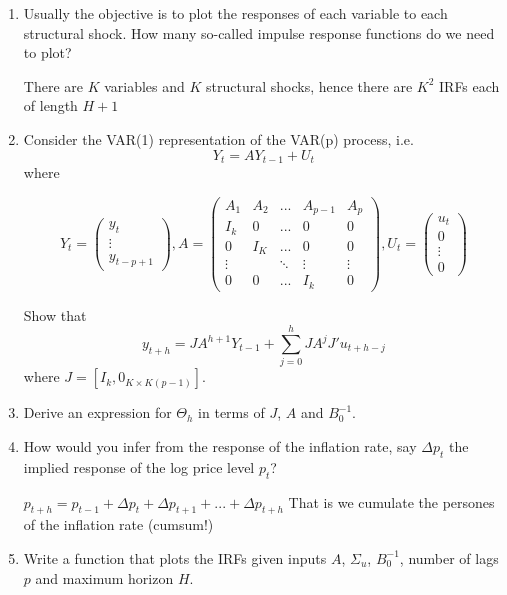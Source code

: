 \documentclass[a4paper]{scrartcl}
\begin{document}
\begin{enumerate}
	\item Usually the objective is to plot the responses of each variable to each structural shock. How many so-called impulse response functions do we need to plot?
	\begin{solution}
		There are $K$ variables and $K$ structural shocks, hence there are $K^2$ IRFs each of length $H+1$
	\end{solution}
	\item Consider the VAR(1) representation of the VAR(p) process, i.e. $$Y_t = A Y_{t-1} + U_t$$ where \begin{footnotesize}
		$$Y_t = \begin{pmatrix}
	y_t\\ \vdots\\ y_{t-p+1}
	\end{pmatrix}, 
	A = \begin{pmatrix}
	A_1 & A_2 & ... & A_{p-1} & A_p\\
	I_k &   0 & ... & 0       & 0\\
	0   &  I_K& ... & 0       & 0\\
	\vdots &  & \ddots &\vdots & \vdots\\ 
	0& 0 & ... &I_k & 0
	\end{pmatrix},
	U_t = \begin{pmatrix} u_t\\0\\\vdots\\0 \end{pmatrix}$$
	\end{footnotesize}
	Show that $$y_{t+h} = J A^{h+1} Y_{t-1}+ \sum_{j=0}^h J A^j J' u_{t+h-j}$$ where $J=[I_k, 0_{K\times K(p-1)}]$.
	\item Derive an expression for $\Theta_h$ in terms of $J$, $A$ and $B_0^{-1}$.
	\item How would you infer from the response of the inflation rate, say $\Delta p_t$ the implied response of the log price level $p_t$?
	\begin{solution}
		$p_{t+h}=p_{t-1}+\Delta p_t +\Delta p_{t+1} + ...+\Delta p_{t+h}$ That is we cumulate the persones of the inflation rate (cumsum!)
	\end{solution}
	\item Write a function that plots the IRFs given inputs $A$, $\Sigma_u$, $B_0^{-1}$, number of lags $p$ and maximum horizon $H$.
\end{enumerate}
\end{document}
